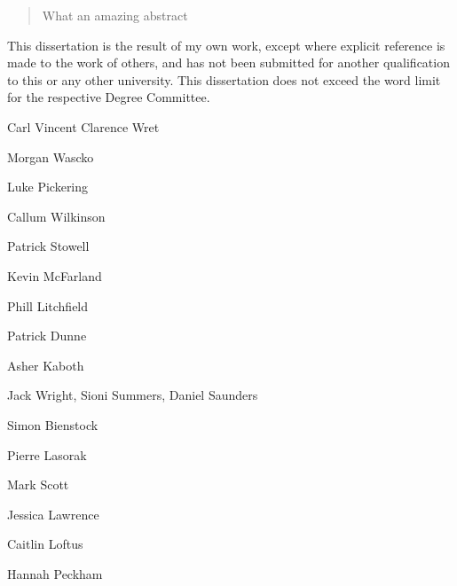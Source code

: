 
\begin{abstract}%
  What an amazing abstract
\end{abstract}

\begin{declaration}
  This dissertation is the result of my own work, except where explicit reference is made to the work of others, and has not been submitted for another qualification to this or any other university. This dissertation does not exceed the word limit for the respective Degree Committee.
  \vspace*{1cm}
  \begin{flushright}
    Carl Vincent Clarence Wret
  \end{flushright}
\end{declaration}

\begin{acknowledgements}
  Morgan Wascko
  
  Luke Pickering
  
  Callum Wilkinson
  
  Patrick Stowell
  
  Kevin McFarland
  
  Phill Litchfield
  
  Patrick Dunne
  
  Asher Kaboth
  
  Jack Wright, Sioni Summers, Daniel Saunders
  
  Simon Bienstock
  
  Pierre Lasorak
  
  Mark Scott
  
  Jessica Lawrence
  
  Caitlin Loftus
  
  Hannah Peckham
\end{acknowledgements}

\iffalse
\begin{preface}
  This thesis describes my research on various aspects of the \LHCb
  particle physics program, centred around the \LHCb detector and \LHC
  accelerator at \CERN in Geneva.

  \noindent
  For this example, I'll just mention \ChapterRef{chap:SomeStuff} and \ChapterRef{chap:MoreStuff}.
\end{preface}
\fi

\tableofcontents

\thispagestyle{empty}
